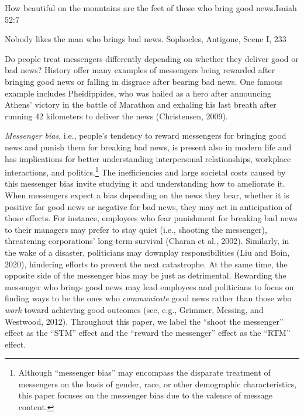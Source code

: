 \begin{epigraph}
  {How beautiful on the mountains are the feet of those who bring good news.}{Isaiah 52:7}
\end{epigraph}
  
\begin{epigraph}
  {Nobody likes the man who brings bad news.}
  {Sophocles, Antigone, Scene I, 233}
\end{epigraph}

\vspace{.5cm}

Do people treat messengers differently depending on whether they deliver
good or bad news? History offer many examples of
messengers being rewarded after bringing good news or falling in
disgrace after bearing bad news. One famous example includes
Pheidippides, who was hailed as a hero after announcing Athens' victory
in the battle of Marathon and exhaling his last breath after running 42
kilometers to deliver the news (Christensen, 2009).

\emph{Messenger bias}, i.e., people's tendency to reward messengers for
bringing good news and punish them for breaking bad news, is present
also in modern life and has implications for better understanding
interpersonal relationships, workplace interactions, and
politics.\footnote{Although ``messenger bias'' may encompass the
  disparate treatment of messengers on the basis of gender, race, or
  other demographic characteristics, this paper focuses on the messenger
  bias due to the valence of message content.} The inefficiencies and
large societal costs caused by this messenger bias invite studying it
and understanding how to ameliorate it. When messengers expect a bias
depending on the news they bear, whether it is positive for good news or
negative for bad news, they may act in anticipation of those effects.
For instance, employees who fear punishment for breaking bad news to
their managers may prefer to stay quiet (i.e., shooting the messenger),
threatening corporations' long-term survival (Charan et al., 2002).
Similarly, in the wake of a disaster, politicians may downplay
responsibilities (Liu and Boin, 2020), hindering efforts to prevent the
next catastrophe. At the same time, the opposite side of the messenger
bias may be just as detrimental. Rewarding the messenger who brings good
news may lead employees and politicians to focus on finding ways to be
the ones who \emph{communicate} good news rather than those who
\emph{work} toward achieving good outcomes (see, e.g., Grimmer, Messing,
and Westwood, 2012). Throughout this paper, we label the ``shoot the
messenger'' effect as the ``STM'' effect and the ``reward the
messenger'' effect as the ``RTM'' effect.


